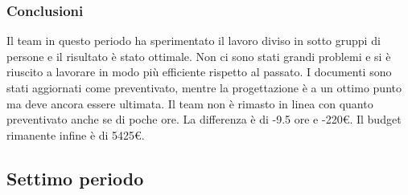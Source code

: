 \subsubsection{Conclusioni}
Il team in questo periodo ha sperimentato il lavoro diviso in sotto gruppi di persone e il risultato è stato ottimale. Non ci sono stati grandi problemi e si è riuscito a lavorare in modo più efficiente rispetto al passato. I documenti sono stati aggiornati come preventivato, mentre la progettazione è a un ottimo punto ma deve ancora essere ultimata.
Il team non è rimasto in linea con quanto preventivato anche se di poche ore. La differenza è di -9.5 ore e -220€. Il budget rimanente infine è di 5425€.

\subsection{Settimo periodo}
